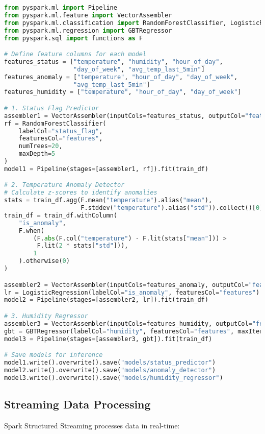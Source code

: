 \documentclass[11pt, a4paper]{article}
\newenvironment{customcode}[1]{
  \begin{tcolorbox}[
    enhanced,
    colback=codebg,
    colframe=codeframe,
    arc=0pt,
    outer arc=0pt,
    boxrule=1pt,
    left=10pt,
    right=10pt,
    top=10pt,
    bottom=10pt,
    title={#1},
    fonttitle=\sffamily\bfseries\color{mainblue},
    coltitle=white,
    colbacktitle=secondaryblue,
    attach boxed title to top left={xshift=10pt, yshift=-\tcboxedtitleheight/2},
    boxed title style={
      sharp corners,
      boxrule=0pt,
    },
  ]
}{
  \end{tcolorbox}
}
\begin{document}
\begin{customcode}{ML Model Training (PySpark)}
\begin{lstlisting}[language=Python]
from pyspark.ml import Pipeline
from pyspark.ml.feature import VectorAssembler
from pyspark.ml.classification import RandomForestClassifier, LogisticRegression
from pyspark.ml.regression import GBTRegressor
from pyspark.sql import functions as F

# Define feature columns for each model
features_status = ["temperature", "humidity", "hour_of_day", 
                   "day_of_week", "avg_temp_last_5min"]
features_anomaly = ["temperature", "hour_of_day", "day_of_week", 
                   "avg_temp_last_5min"]
features_humidity = ["temperature", "hour_of_day", "day_of_week"]

# 1. Status Flag Predictor
assembler1 = VectorAssembler(inputCols=features_status, outputCol="features")
rf = RandomForestClassifier(
    labelCol="status_flag", 
    featuresCol="features", 
    numTrees=20,
    maxDepth=5
)
model1 = Pipeline(stages=[assembler1, rf]).fit(train_df)

# 2. Temperature Anomaly Detector
# Calculate z-scores to identify anomalies
stats = train_df.agg(F.mean("temperature").alias("mean"), 
                     F.stddev("temperature").alias("std")).collect()[0]
train_df = train_df.withColumn(
    "is_anomaly", 
    F.when(
        (F.abs(F.col("temperature") - F.lit(stats["mean"])) > 
         F.lit(2 * stats["std"])),
        1
    ).otherwise(0)
)

assembler2 = VectorAssembler(inputCols=features_anomaly, outputCol="features")
lr = LogisticRegression(labelCol="is_anomaly", featuresCol="features")
model2 = Pipeline(stages=[assembler2, lr]).fit(train_df)

# 3. Humidity Regressor
assembler3 = VectorAssembler(inputCols=features_humidity, outputCol="features")
gbt = GBTRegressor(labelCol="humidity", featuresCol="features", maxIter=10)
model3 = Pipeline(stages=[assembler3, gbt]).fit(train_df)

# Save models for inference
model1.write().overwrite().save("models/status_predictor")
model2.write().overwrite().save("models/anomaly_detector")
model3.write().overwrite().save("models/humidity_regressor")
\end{lstlisting}
\end{customcode}

\clearpage
\subsection{Streaming Data Processing}
Spark Structured Streaming processes data in real-time:
\end{document}
